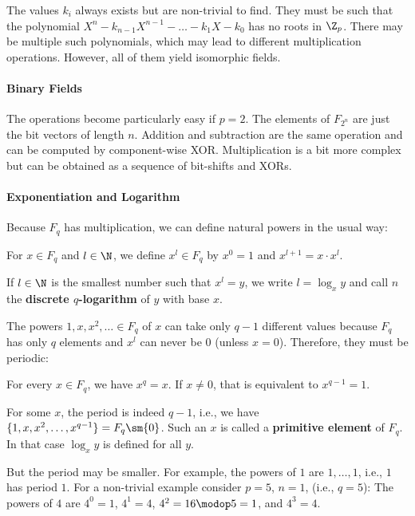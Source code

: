 The values $k_i$ always exists but are non-trivial to find.
They must be such that the polynomial $X^n-k_{n-1}X^{n-1}-\ldots-k_1X-k_0$ has no roots in $\Z_p$.
There may be multiple such polynomials, which may lead to different multiplication operations.
However, all of them yield isomorphic fields.

\paragraph{Binary Fields}
The operations become particularly easy if $p=2$.
The elements of $F_{2^n}$ are just the bit vectors of length $n$.
Addition and subtraction are the same operation and can be computed by component-wise XOR.
Multiplication is a bit more complex but can be obtained as a sequence of bit-shifts and XORs.

\paragraph{Exponentiation and Logarithm}
Because $F_q$ has multiplication, we can define natural powers in the usual way:

\begin{definition}
For $x\in F_q$ and $l\in\N$, we define $x^l\in F_q$ by $x^0=1$ and $x^{l+1}=x\cdot x^l$.

If $l\in \N$ is the smallest number such that $x^l=y$, we write $l=\log_x y$ and call $n$ the \textbf{discrete $q$-logarithm} of $y$ with base $x$.
\end{definition}

The powers $1,x,x^2,\ldots\in F_q$ of $x$ can take only $q-1$ different values because $F_q$ has only $q$ elements and $x^l$ can never be $0$ (unless $x=0$).
Therefore, they must be periodic:

\begin{theorem}
For every $x\in F_q$, we have $x^q=x$. If $x\neq 0$, that is equivalent to $x^{q-1}=1$.
\end{theorem}

For some $x$, the period is indeed $q-1$, i.e., we have $\{1,x,x^2,\ldots,x^{q-1}\}=F_q\sm\{0\}$.
Such an $x$ is called a \textbf{primitive element} of $F_q$.
In that case $\log_x y$ is defined for all $y$.

But the period may be smaller.
For example, the powers of $1$ are $1,\ldots,1$, i.e., $1$ has period $1$.
For a non-trivial example consider $p=5$, $n=1$, (i.e., $q=5$): The powers of $4$ are $4^0=1$, $4^1=4$, $4^2=16\modop 5=1$, and $4^3=4$.

